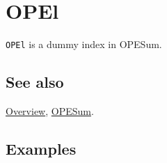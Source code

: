 \documentclass[../FeynCalcManual.tex]{subfiles}
\begin{document}
\hypertarget{opel}{
\section{OPEl}\label{opel}}

\texttt{OPEl} is a dummy index in OPESum.

\subsection{See also}

\hyperlink{toc}{Overview}, \hyperlink{opesum}{OPESum}.

\subsection{Examples}
\end{document}
